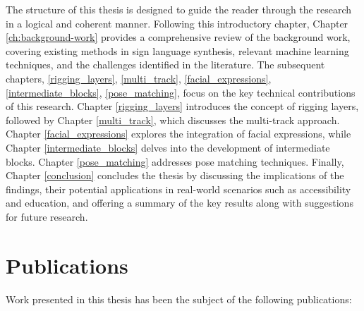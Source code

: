 \documentclass[../../main.tex]{subfiles}
\begin{document}
The structure of this thesis is designed to guide the reader through the research in a logical and coherent manner. Following this introductory chapter, Chapter \ref{ch:background-work} provides a comprehensive review of the background work, covering existing methods in sign language synthesis, relevant machine learning techniques, and the challenges identified in the literature. The subsequent chapters, \ref{rigging_layers}, \ref{multi_track}, \ref{facial_expressions}, \ref{intermediate_blocks}, \ref{pose_matching}, focus on the key technical contributions of this research. Chapter \ref{rigging_layers} introduces the concept of rigging layers, followed by Chapter \ref{multi_track}, which discusses the multi-track approach. Chapter \ref{facial_expressions} explores the integration of facial expressions, while Chapter \ref{intermediate_blocks} delves into the development of intermediate blocks. Chapter \ref{pose_matching} addresses pose matching techniques. Finally, Chapter \ref{conclusion} concludes the thesis by discussing the implications of the findings, their potential applications in real-world scenarios such as accessibility and education, and offering a summary of the key results along with suggestions for future research.


\section{Publications}
Work presented in this thesis has been the subject of the following publications:
\begin{cvpubs}
\end{cvpubs}

\begin{cvpubs}
\end{cvpubs}

\begin{cvpubs}
\end{cvpubs}

\begin{cvpubs}
\end{cvpubs}

\begin{cvpubs}
\end{cvpubs}

\begin{cvpubs}
\end{cvpubs}
\end{document}
